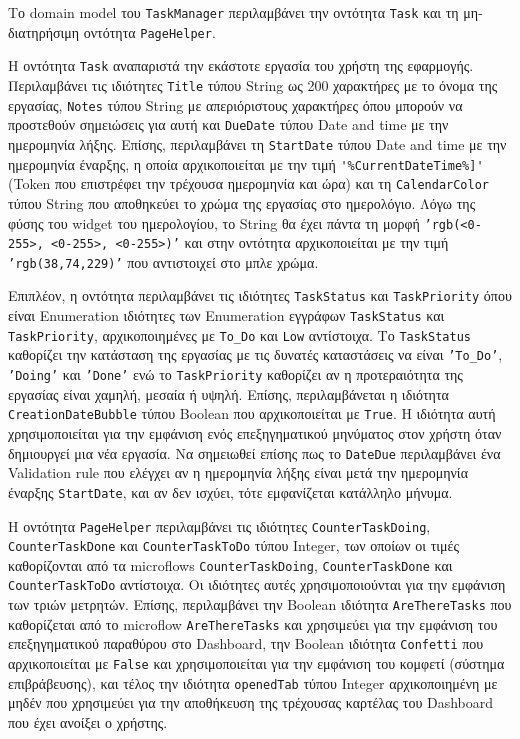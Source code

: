                 Το domain model του \texttt{TaskManager} περιλαμβάνει την οντότητα \texttt{Task} και τη μη-διατηρήσιμη οντότητα \texttt{PageHelper}.

                Η οντότητα \texttt{Task} αναπαριστά την εκάστοτε εργασία του χρήστη της εφαρμογής. Περιλαμβάνει τις ιδιότητες \texttt{Title} τύπου String ως 200 χαρακτήρες με το όνομα της εργασίας, \texttt{Notes} τύπου String με απεριόριστους χαρακτήρες όπου μπορούν να προστεθούν σημειώσεις για αυτή και \texttt{DueDate} τύπου Date and time με την ημερομηνία λήξης. Επίσης, περιλαμβάνει τη \texttt{StartDate} τύπου Date and time με την ημερομηνία έναρξης, η οποία αρχικοποιείται με την τιμή \verb|'%CurrentDateTime%]'| (Token που επιστρέφει την τρέχουσα ημερομηνία και ώρα) και τη \texttt{CalendarColor} τύπου String που αποθηκεύει το χρώμα της εργασίας στο ημερολόγιο. Λόγω της φύσης του widget του ημερολογίου, το String θα έχει πάντα τη μορφή \texttt{'rgb(<0-255>, <0-255>, <0-255>)'} και στην οντότητα αρχικοποιείται με την τιμή \texttt{'rgb(38,74,229)'} που αντιστοιχεί στο μπλε χρώμα.

                Επιπλέον, η οντότητα περιλαμβάνει τις ιδιότητες \texttt{TaskStatus} και \texttt{TaskPriority} όπου είναι Enumeration ιδιότητες των Enumeration εγγράφων \texttt{TaskStatus} και \linebreak \texttt{TaskPriority}, αρχικοποιημένες με \texttt{To\_Do} και \texttt{Low} αντίστοιχα. Το \texttt{TaskStatus} καθορίζει την κατάσταση της εργασίας με τις δυνατές καταστάσεις να είναι \texttt{'To\_Do'}, \texttt{'Doing'} και \texttt{'Done'} ενώ το \texttt{TaskPriority} καθορίζει αν η προτεραιότητα της εργασίας είναι χαμηλή, μεσαία ή υψηλή. Επίσης, περιλαμβάνεται η ιδιότητα \texttt{CreationDateBubble} τύπου Boolean που αρχικοποιείται με \texttt{True}. Η ιδιότητα αυτή χρησιμοποιείται για την εμφάνιση ενός επεξηγηματικού μηνύματος στον χρήστη όταν δημιουργεί μια νέα εργασία. Να σημειωθεί επίσης πως το \texttt{DateDue} περιλαμβάνει ένα Validation rule που ελέγχει αν η ημερομηνία λήξης είναι μετά την ημερομηνία έναρξης \texttt{StartDate}, και αν δεν ισχύει, τότε εμφανίζεται κατάλληλο μήνυμα.

                Η οντότητα \texttt{PageHelper} περιλαμβάνει τις ιδιότητες \texttt{CounterTaskDoing}, \linebreak \texttt{CounterTaskDone} και \texttt{CounterTaskToDo} τύπου Integer, των οποίων οι τιμές καθορίζονται από τα microflows \texttt{CounterTaskDoing}, \texttt{CounterTaskDone} και \texttt{CounterTaskToDo} αντίστοιχα. Οι ιδιότητες αυτές χρησιμοποιούνται για την εμφάνιση των τριών μετρητών. Επίσης, περιλαμβάνει την Boolean ιδιότητα \texttt{AreThereTasks} που καθορίζεται από το microflow \texttt{AreThereTasks} και χρησιμεύει για την εμφάνιση του επεξηγηματικού παραθύρου στο Dashboard, την Boolean ιδιότητα \texttt{Confetti} που αρχικοποιείται με \texttt{False} και χρησιμοποιείται για την εμφάνιση του κομφετί (σύστημα επιβράβευσης), και τέλος την ιδιότητα \texttt{openedTab} τύπου Integer αρχικοποιημένη με μηδέν που χρησιμεύει για την αποθήκευση της τρέχουσας καρτέλας του Dashboard που έχει ανοίξει ο χρήστης.

